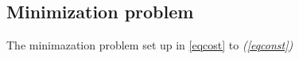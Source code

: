 \subsection{Minimization problem}
\label{mini_problem}

The minimazation problem set up in \eqref{eqcost} to \textit{(\ref{eqconst})}


